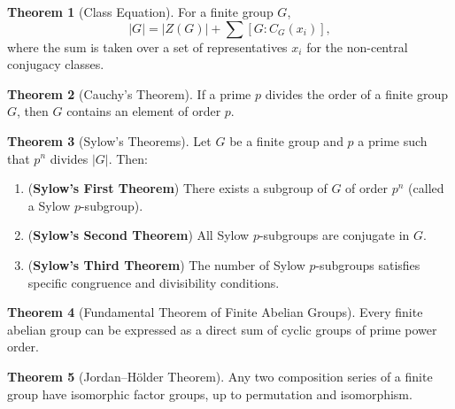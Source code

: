 \documentclass[12pt]{article}
\theoremstyle{definition} %
\newtheorem{theorem}{Theorem}
\theoremstyle{plain} %
\begin{document}
\begin{theorem}[Class Equation]
For a finite group \(G\),
\[
|G| = |Z(G)| + \sum [G:C_G(x_i)],
\]
where the sum is taken over a set of representatives \(x_i\) for the non-central conjugacy classes.
\end{theorem}

\begin{theorem}[Cauchy's Theorem]
If a prime \(p\) divides the order of a finite group \(G\), then \(G\) contains an element of order \(p\).
\end{theorem}

\begin{theorem}[Sylow's Theorems]
Let \(G\) be a finite group and \(p\) a prime such that \(p^n\) divides \(|G|\). Then:
\begin{enumerate}[label=(\roman*)]
    \item (\textbf{Sylow's First Theorem}) There exists a subgroup of \(G\) of order \(p^n\) (called a Sylow \(p\)-subgroup).
    \item (\textbf{Sylow's Second Theorem}) All Sylow \(p\)-subgroups are conjugate in \(G\).
    \item (\textbf{Sylow's Third Theorem}) The number of Sylow \(p\)-subgroups satisfies specific congruence and divisibility conditions.
\end{enumerate}
\end{theorem}

\begin{theorem}[Fundamental Theorem of Finite Abelian Groups]
Every finite abelian group can be expressed as a direct sum of cyclic groups of prime power order.
\end{theorem}

\begin{theorem}[Jordan–Hölder Theorem]
Any two composition series of a finite group have isomorphic factor groups, up to permutation and isomorphism.
\end{theorem}
\end{document}
